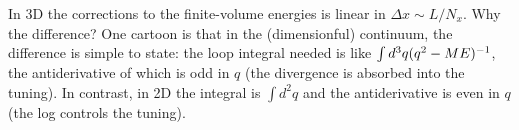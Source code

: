 In 3D the corrections to the finite-volume energies is linear in $\Delta x \sim L/N_x$.
Why the difference?
One cartoon is that in the (dimensionful) continuum, the difference is simple to state: the loop integral needed is like $\int d^3q (q^2-ME)^{-1}$, the antiderivative of which is odd in $q$ (the divergence is absorbed into the tuning).
In contrast, in 2D the integral is $\int d^2q$ and the antiderivative is even in $q$ (the log controls the tuning).
